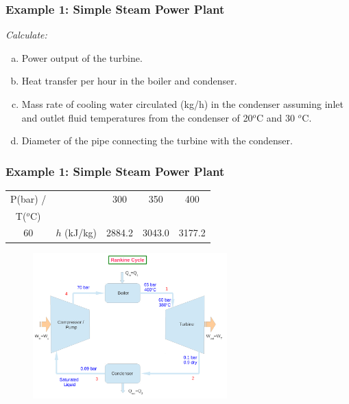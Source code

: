 \documentclass[10pt,compress]{beamer}
\begin{document}
\begin{frame}
 \frametitle{Example 1: Simple Steam Power Plant}
    {\it Calculate:
    \begin{enumerate}[(a)]
     \item Power output of the turbine.
     \item Heat transfer per hour in the boiler and condenser.
     \item Mass rate of cooling water circulated (kg/h) in the condenser assuming inlet and outlet fluid temperatures from the condenser of 20$ ^{o}$C and 30 $^{o}$C.
     \item Diameter of the pipe connecting the turbine with the condenser. 
    \end{enumerate}}
 \normalsize
\end{frame}



\begin{frame}
 \frametitle{Example 1: Simple Steam Power Plant}
     
\begin{center}
       \begin{tabular}{|c c c c c|}
         \hline
          P(bar) /   &      &   300       &  350     &  400 \\
          T($^{o}$C) &       &             &         &      \\
          \hline
             60     &  $h$ (kJ/kg)   &   2884.2   & 3043.0   &  3177.2 \\
          \hline
       \end{tabular} 
\end{center}

    \begin{figure}%
     \begin{center}
      \includegraphics[width=7.5cm,clip]{./Pics/Rankine_Cycle_Exemple01}
     \end{center}
    \end{figure} 


 \normalsize
\end{frame}
\end{document}
